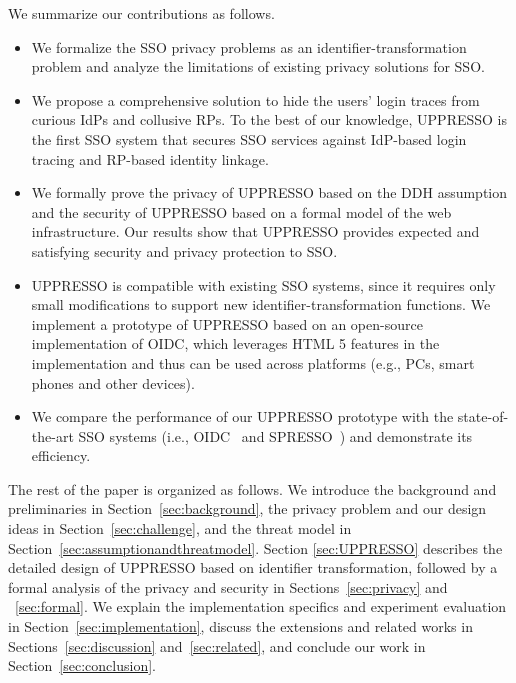 We summarize our contributions as follows.
\begin{itemize}
\vspace{-\topsep}
\item We formalize the SSO privacy problems as an identifier-transformation problem and analyze the limitations of existing privacy solutions for SSO. 
\vspace{-\topsep}
\item We propose a comprehensive solution to hide the users' login traces from curious IdPs and collusive RPs. To the best of our knowledge, UPPRESSO is the first SSO system that secures SSO services against IdP-based login tracing and RP-based identity linkage.
\vspace{-\topsep}
\item We formally prove the privacy of UPPRESSO based on the DDH assumption and the security of UPPRESSO based on a formal model of the web infrastructure. Our results show that UPPRESSO provides expected and satisfying security and privacy protection to SSO.
\vspace{-\topsep}
\item UPPRESSO is compatible with existing SSO systems, since it requires only small modifications to support new identifier-transformation functions. We implement a prototype of UPPRESSO based on an open-source implementation of OIDC, which leverages HTML 5 features in the implementation and thus can be used across platforms (e.g., PCs, smart phones and other devices). %
\vspace{-\topsep}
\item We compare the performance of our UPPRESSO prototype with the state-of-the-art SSO systems (i.e., OIDC~\cite{OpenIDConnect} and SPRESSO~\cite{SPRESSO}) and demonstrate its efficiency.
\end{itemize}
\vspace{-\topsep}
The rest of the paper is organized as follows. We introduce the background and preliminaries in Section~\ref{sec:background}, the privacy problem and our design ideas in Section~\ref{sec:challenge}, and the threat model in Section~\ref{sec:assumptionandthreatmodel}. Section \ref{sec:UPPRESSO} describes the detailed design of UPPRESSO based on identifier transformation, followed by a formal analysis of the privacy and security in Sections~\ref{sec:privacy} and ~\ref{sec:formal}. We explain the implementation specifics and experiment evaluation in Section~\ref{sec:implementation}, discuss the extensions and related works in Sections~\ref{sec:discussion} and~\ref{sec:related}, and conclude our work in Section~\ref{sec:conclusion}.


